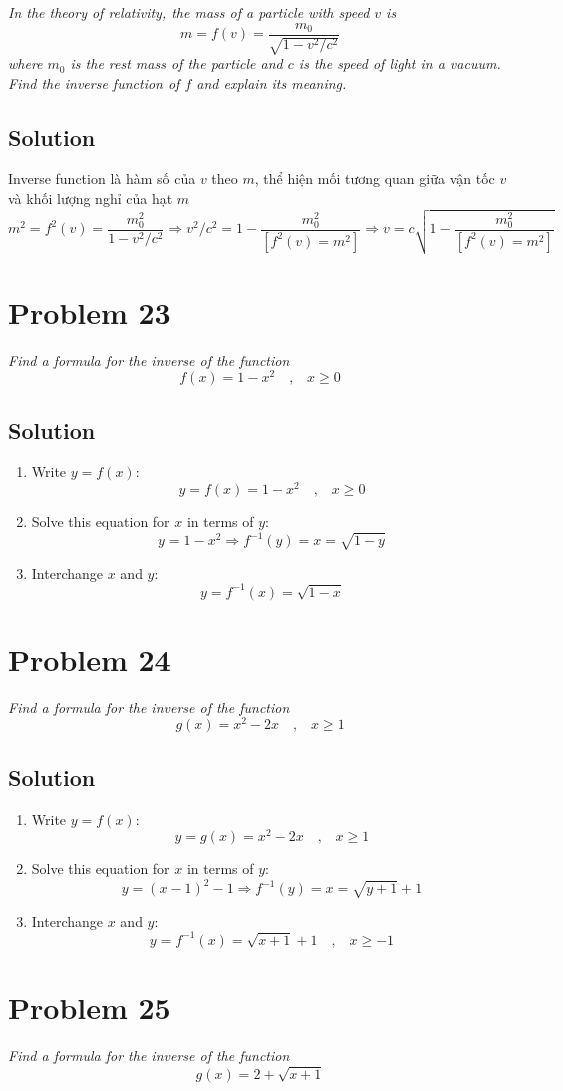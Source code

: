 \documentclass[11pt]{article}
\newcommand{\soln}{\subsection*}
\newcommand{\qn}{\textit}
\newcommand{\eqtext}[1]{\quad\text{#1}\quad}
\begin{document}
\qn{In the theory of relativity, the mass of a particle with speed $v$ is $$m=f(v)=\frac{m_0}{\sqrt{1-v^2/c^2}}$$ where $m_0$ is the rest mass of the particle and $c$ is the speed of light in a vacuum. Find the inverse function of $f$ and explain its meaning.}

\soln{Solution}
Inverse function là hàm số của $v$ theo $m$, thể hiện mối tương quan giữa vận tốc $v$ và khối lượng nghỉ của hạt $m$
$$m^2=f^2(v)=\frac{m^2_0}{1-v^2/c^2} \Rightarrow v^2/c^2=1-\frac{m^2_0}{[f^2(v)=m^2]} \Rightarrow v=c\sqrt{1-\frac{m^2_0}{[f^2(v)=m^2]}}$$

\section*{Problem 23}

\qn{Find a formula for the inverse of the function $$f(x)=1-x^2 \eqtext{,} x \ge 0$$}

\soln{Solution}
\begin{enumerate}
	\item Write $y=f(x)$: $$y=f(x)=1-x^2 \eqtext{,} x \ge 0$$
	\item Solve this equation for $x$ in terms of $y$: $$y=1-x^2 \Rightarrow f^{-1}(y)=x=\sqrt{1-y}$$
	\item Interchange $x$ and $y$: $$y=f^{-1}(x)=\sqrt{1-x}$$
\end{enumerate}

\section*{Problem 24}

\qn{Find a formula for the inverse of the function $$g(x)=x^2-2x \eqtext{,} x \ge 1$$}

\soln{Solution}
\begin{enumerate}
	\item Write $y=f(x)$: $$y=g(x)=x^2-2x \eqtext{,} x \ge 1$$
	\item Solve this equation for $x$ in terms of $y$: $$y=(x-1)^2-1 \Rightarrow f^{-1}(y)=x=\sqrt{y+1}+1$$
	\item Interchange $x$ and $y$: $$y=f^{-1}(x)=\sqrt{x+1}+1 \eqtext{,} x \ge -1$$
\end{enumerate}

\section*{Problem 25}

\qn{Find a formula for the inverse of the function $$g(x)=2+\sqrt{x+1}$$}
\end{document}
